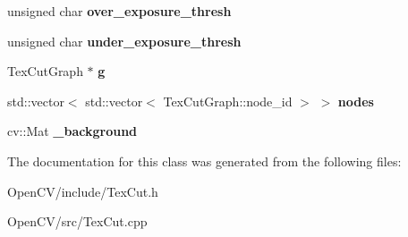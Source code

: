 \begin{DoxyCompactItemize}
\hypertarget{classskl_1_1_tex_cut_ae224d178a3fd00cd5f1a0aaa13726878}{}\label{classskl_1_1_tex_cut_ae224d178a3fd00cd5f1a0aaa13726878} 
unsigned char {\bfseries over\+\_\+exposure\+\_\+thresh}
\item 
\hypertarget{classskl_1_1_tex_cut_ae07cb809d654962b87e56983b7368645}{}\label{classskl_1_1_tex_cut_ae07cb809d654962b87e56983b7368645} 
unsigned char {\bfseries under\+\_\+exposure\+\_\+thresh}
\item 
\hypertarget{classskl_1_1_tex_cut_abafc4ac9524a8bc0a1d9ab901890b70a}{}\label{classskl_1_1_tex_cut_abafc4ac9524a8bc0a1d9ab901890b70a} 
Tex\+Cut\+Graph $\ast$ {\bfseries g}
\item 
\hypertarget{classskl_1_1_tex_cut_a9db20e8dc253db61021acd1d1fdcd360}{}\label{classskl_1_1_tex_cut_a9db20e8dc253db61021acd1d1fdcd360} 
std\+::vector$<$ std\+::vector$<$ Tex\+Cut\+Graph\+::node\+\_\+id $>$ $>$ {\bfseries nodes}
\item 
\hypertarget{classskl_1_1_tex_cut_a8a7aa37cd4557825e6de41cf34185e43}{}\label{classskl_1_1_tex_cut_a8a7aa37cd4557825e6de41cf34185e43} 
cv\+::\+Mat {\bfseries \+\_\+background}
\end{DoxyCompactItemize}


The documentation for this class was generated from the following files\+:\begin{DoxyCompactItemize}
\item 
Open\+C\+V/include/Tex\+Cut.\+h\item 
Open\+C\+V/src/Tex\+Cut.\+cpp\end{DoxyCompactItemize}

